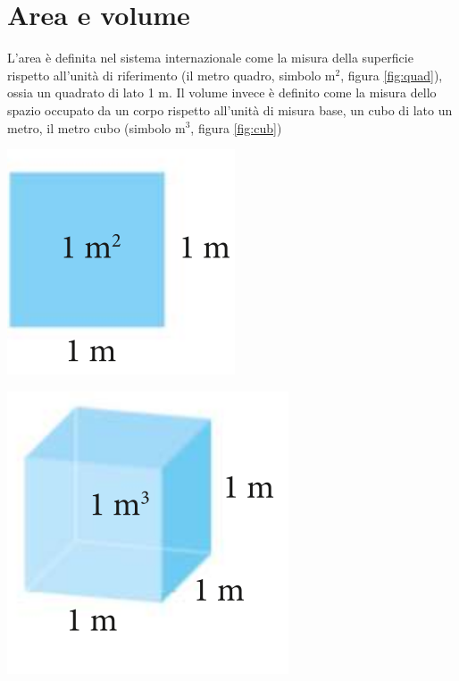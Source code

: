 \section{Area e volume}
L'area è definita nel sistema internazionale come la misura della superficie rispetto all'unità di riferimento (il metro quadro, simbolo $\si{\square\meter}$, figura  \ref{fig:quad}), ossia un quadrato di lato 1 m. Il volume invece è definito come la misura dello spazio occupato da un corpo rispetto all'unità di misura base, un cubo di lato un metro, il metro cubo (simbolo $\si{\cubic\meter}$, figura \ref{fig:cub})\\

\begin{minipage}{\linewidth}
	\centering
	\includegraphics[scale=0.3]{quad}
	\label{fig:quad}
\end{minipage}
\begin{minipage}{\linewidth}
	\centering
	\includegraphics[scale=0.3]{cub}
	\label{fig:cub}
\end{minipage}


